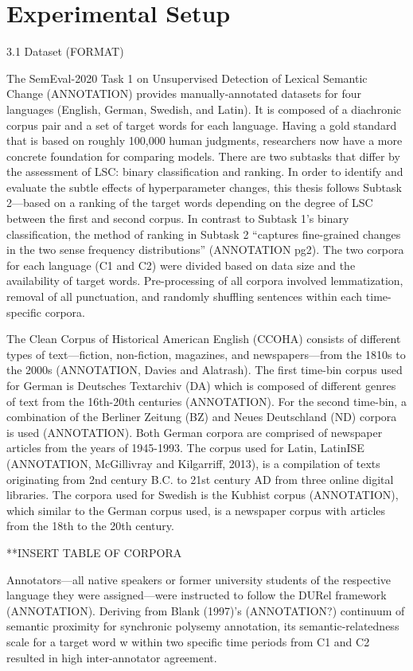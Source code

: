 \section{Experimental Setup}

3.1 Dataset (FORMAT)

The SemEval-2020 Task 1 on Unsupervised Detection of Lexical Semantic Change (ANNOTATION) provides manually-annotated datasets for four languages (English, German, Swedish, and Latin). It is composed of a diachronic corpus pair and a set of target words for each language. Having a gold standard that is based on roughly 100,000 human judgments, researchers now have a more concrete foundation for comparing models. There are two subtasks that differ by the assessment of LSC: binary classification and ranking. In order to identify and evaluate the subtle effects of hyperparameter changes, this thesis follows Subtask 2—based on a ranking of the target words depending on the degree of LSC between the first and second corpus. In contrast to Subtask 1’s binary classification, the method of ranking in Subtask 2 “captures fine-grained changes in the two sense frequency distributions” (ANNOTATION pg2). The two corpora for each language (C1 and C2) were divided based on data size and the availability of target words. Pre-processing of all corpora involved lemmatization, removal of all punctuation, and randomly shuffling sentences within each time-specific corpora. 

The Clean Corpus of Historical American English (CCOHA) consists of different types of text—fiction, non-fiction, magazines, and newspapers—from the 1810s to the 2000s (ANNOTATION, Davies and Alatrash). The first time-bin corpus used for German is Deutsches Textarchiv (DA) which is composed of different genres of text from the 16th-20th centuries (ANNOTATION). For the second time-bin, a combination of the Berliner Zeitung (BZ) and Neues Deutschland (ND) corpora is used (ANNOTATION). Both German corpora are comprised of newspaper articles from the years of 1945-1993. The corpus used for Latin, LatinISE (ANNOTATION, McGillivray and Kilgarriff, 2013), is a compilation of texts originating from 2nd century B.C. to 21st century AD from three online digital libraries. The corpora used for Swedish is the Kubhist corpus (ANNOTATION), which similar to the German corpus used, is a newspaper corpus with articles from the 18th to the 20th century. 

**INSERT TABLE OF CORPORA 

Annotators—all native speakers or former university students of the respective language they were assigned—were instructed to follow the DURel framework (ANNOTATION). Deriving from Blank (1997)’s (ANNOTATION?) continuum of semantic proximity for synchronic polysemy annotation, its semantic-relatedness scale for a target word w within two specific time periods from C1 and C2 resulted in high inter-annotator agreement. 
	
